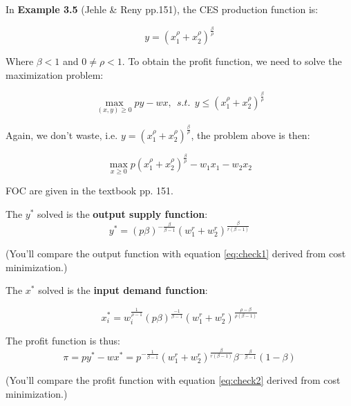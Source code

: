 \documentclass{article}
\begin{document}
\vspace{2mm}

\begin{mdframed}[backgroundcolor=blue!20,linecolor=white]

In \textbf{Example 3.5} (Jehle \& Reny pp.151), the CES production function is:

$$y = (x_1^\rho + x_2^\rho)^{\frac{\beta}{\rho}}$$

Where $\beta < 1$ and $0 \ne \rho <1$. To obtain the profit function, we need to solve the maximization problem:


$$\max_{(x,y) \ge 0} py - wx, \ \ s.t. \ \ y \le (x_1^\rho + x_2^\rho)^{\frac{\beta}{\rho}}$$

Again, we don't waste, i.e. $ y = (x_1^\rho + x_2^\rho)^{\frac{\beta}{\rho}}$, the problem above is then:

$$\max_{x \ge 0} p(x_1^\rho + x_2^\rho)^{\frac{\beta}{\rho}} - w_1x_1 - w_2x_2$$

FOC are given in the textbook pp. 151. 

The $y^*$ solved is the \textbf{output supply function}:
\begin{equation}
y^* = (p\beta)^{-\frac{\beta}{\beta - 1}}(w_1^r + w_2^r)^{\frac{\beta}{r(\beta - 1)}}
    \label{eq:E5}   
\end{equation}

(You'll compare the output function with equation \ref{eq:check1} derived from cost minimization.)

The $x^*$ solved is the \textbf{input demand function}:

\begin{equation}
x_i^* = w_i^{\frac{1}{\rho -1}}  (p\beta)^{\frac{-1}{\beta - 1}}(w_1^r + w_2^r)^{\frac{\rho -\beta}{\rho(\beta -1)}}
    \label{eq:E6}   
\end{equation}



The profit function is thus:
\begin{equation}
\pi = py^* - wx^* = p^{-\frac{1}{\beta - 1}} (w_1^r + w_2^r)^{\frac{\beta}{r(\beta - 1)}}\beta^{-\frac{\beta}{\beta - 1}}(1-\beta)
    \label{eq:E7}   
\end{equation}

(You'll compare the profit function with equation \ref{eq:check2} derived from cost minimization.)

\end{mdframed}

\vspace{2mm}
\end{document}
